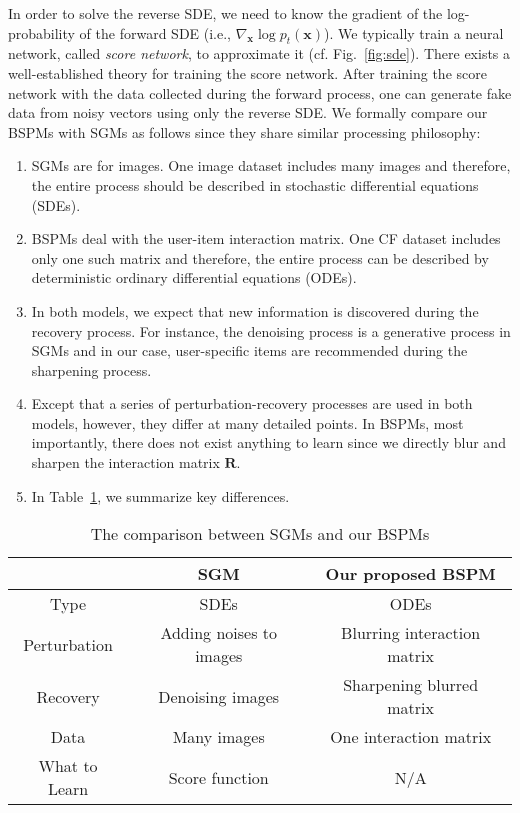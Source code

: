 \documentclass[sigconf,natbib=true]{acmart}
\begin{document}
In order to solve the reverse SDE, we need to know the gradient of the log-probability of the forward SDE (i.e., $\nabla_\mathbf{x} \log p_t(\mathbf{x})$). We typically train a neural network, called \emph{score network}, to approximate it (cf. Fig.~\ref{fig:sde}). There exists a well-established theory for training the score network. After training the score network with the data collected during the forward process, one can generate fake data from noisy vectors using only the reverse SDE. We formally compare our BSPMs with SGMs as follows since they share similar processing philosophy:
\begin{enumerate}
    \item SGMs are for images. One image dataset includes many images and therefore, the entire process should be described in stochastic differential equations (SDEs).
    \item BSPMs deal with the user-item interaction matrix. One CF dataset includes only one such matrix and therefore, the entire process can be described by deterministic ordinary differential equations (ODEs).
    \item In both models, we expect that new information is discovered during the recovery process. For instance, the denoising process is a generative process in SGMs and in our case, user-specific items are recommended during the sharpening process.
    \item Except that a series of perturbation-recovery processes are used in both models, however, they differ at many detailed points. In BSPMs, most importantly, there does not exist anything to learn since we directly blur and sharpen the interaction matrix $\bm{R}$.
    \item In Table~\ref{tbl:cmp}, we summarize key differences.
\end{enumerate}
\begin{table}[t]
    \small
    \setlength{\tabcolsep}{2pt}
    \caption{The comparison between SGMs and our BSPMs\label{tbl:cmp}}
    \begin{tabular}{ccc}\toprule
         & SGM & Our proposed BSPM \\ \midrule
        Type & SDEs & ODEs \\ 
        Perturbation & Adding noises to images & Blurring interaction matrix \\
        Recovery & Denoising images & Sharpening blurred matrix \\ 
        Data & Many images  & One interaction matrix \\
        What to Learn & Score function & N/A \\         \bottomrule
    \end{tabular}
\end{table}
\end{document}
